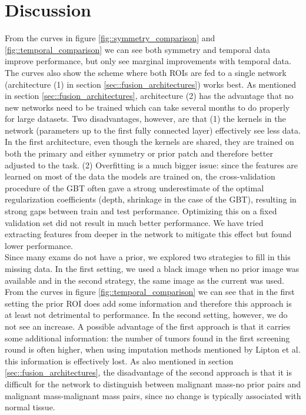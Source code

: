 \documentclass[12pt]{spieman}  %
\begin{document}
\section{Discussion}
\label{sec::discussion}
From the curves in figure \ref{fig::symmetry_comparison} and \ref{fig::temporal_comparison} we can see both symmetry and temporal data improve performance, but only see marginal improvements with temporal data. The curves also show the scheme where both ROIs are fed to a single network (architecture (1) in section \ref{sec::fusion_architectures}) works best. As mentioned in section \ref{sec::fusion_architectures}, architecture (2) has the advantage that no new networks need to be trained which can take several months to do properly for large datasets. Two disadvantages, however, are that (1) the kernels in the network (parameters up to the first fully connected layer) effectively see less data. In the first architecture, even though the kernels are shared, they are trained on both the primary and either symmetry or prior patch and therefore better adjusted to the task. (2) Overfitting is a much bigger issue: since the features are learned on most of the data the models are trained on, the cross-validation procedure of the GBT often gave a strong underestimate of the optimal regularization coefficients (depth, shrinkage in the case of the GBT), resulting in strong gaps between train and test performance. Optimizing this on a fixed validation set did not result in much better performance. We have tried extracting features from deeper in the network to mitigate this effect but found lower performance. \\ 

Since many exams do not have a prior, we explored two strategies to fill in this missing data. In the first setting, we used a black image when no prior image was available and in the second strategy, the same image as the current was used. From the curves in figure \ref{fig::temporal_comparison} we can see that in the first setting the prior ROI does add some information and therefore this approach is at least not detrimental to performance. In the second setting, however, we do not see an increase. A possible advantage of the first approach is that it carries some additional information: the number of tumors found in the first screening round is often higher, when using imputation methods mentioned by Lipton et al. \cite{Lipt15a} this information is effectively lost. As also mentioned in section \ref{sec::fusion_architectures}, the disadvantage of the second approach is that it is difficult for the network to distinguish between malignant mass-no prior pairs and malignant mass-malignant mass pairs, since no change is typically associated with normal tissue. \\
\end{document}
